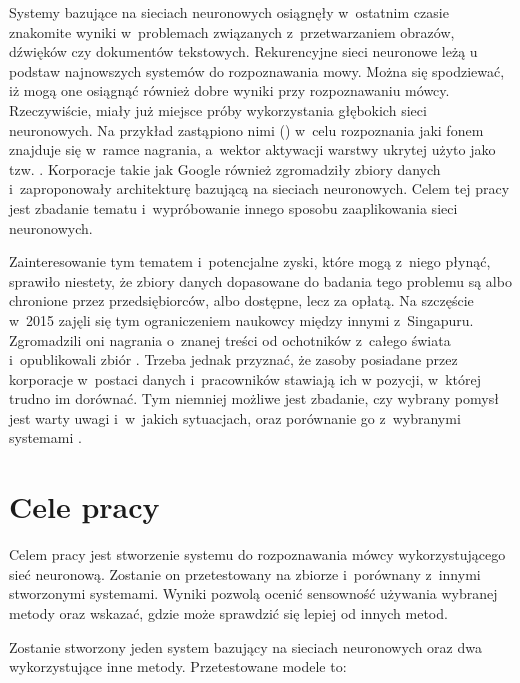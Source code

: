 Systemy bazujące na sieciach neuronowych osiągnęły w~ostatnim czasie znakomite wyniki w~problemach
związanych z~przetwarzaniem obrazów, dźwięków czy dokumentów tekstowych. Rekurencyjne sieci neuronowe
leżą u podstaw najnowszych systemów do rozpoznawania mowy. Można się spodziewać, iż mogą one
osiągnąć również dobre wyniki przy rozpoznawaniu mówcy. Rzeczywiście, miały już miejsce próby
wykorzystania głębokich sieci neuronowych. Na przykład zastąpiono nimi
 () w~celu rozpoznania
jaki fonem znajduje się w~ramce nagrania, a~wektor aktywacji warstwy ukrytej użyto jako tzw.
\cite{investigationOfBottleneck}.
Korporacje takie jak Google również zgromadziły zbiory danych i~zaproponowały architekturę bazującą na sieciach
neuronowych\cite{endToEnd}. Celem tej pracy jest zbadanie tematu i~wypróbowanie innego sposobu zaaplikowania
sieci neuronowych.

Zainteresowanie tym tematem i~potencjalne zyski, które mogą z~niego płynąć, sprawiło niestety,
że zbiory danych dopasowane do badania tego problemu są albo chronione przez przedsiębiorców,
albo dostępne, lecz za opłatą. Na szczęście w~2015 zajęli się tym ograniczeniem naukowcy
między innymi z~Singapuru. Zgromadzili oni nagrania o~znanej
treści od ochotników z~całego świata i~opublikowali zbiór . Trzeba jednak przyznać, że
zasoby posiadane przez korporacje w~postaci danych i~pracowników stawiają ich
w pozycji, w~której trudno im dorównać. Tym niemniej możliwe jest zbadanie, czy wybrany pomysł
jest warty uwagi i~w~jakich sytuacjach, oraz porównanie go z~wybranymi systemami .

\section{Cele pracy}\label{sec:cele_pracy}

Celem pracy jest stworzenie systemu do rozpoznawania mówcy wykorzystującego sieć neuronową.
Zostanie on przetestowany na zbiorze  i~porównany z~innymi stworzonymi systemami.
Wyniki pozwolą ocenić sensowność używania wybranej metody oraz wskazać, gdzie może sprawdzić się lepiej
od innych metod.

Zostanie stworzony jeden system bazujący na sieciach neuronowych oraz dwa wykorzystujące inne metody. Przetestowane
modele to:


